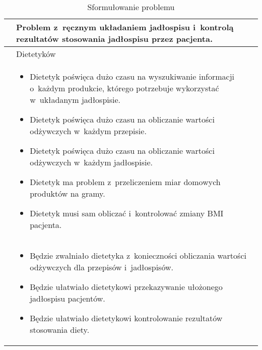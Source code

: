 \begin{minipage}{\textwidth}
    \begin{table}[H]
        \centering\caption{Sformułowanie problemu \source{\ownwork}\label{tabela:sformulowanie-problemu}}
        \begin{tabular}{|P{.2\textwidth}|p{.7\textwidth}|}

            \hline
             &
            Problem z~ręcznym układaniem jadłospisu i~kontrolą rezultatów stosowania jadłospisu przez pacjenta. \\
            \hline

             &
            Dietetyków \\
            \hline

             &
            \begin{itemize}
                \item Dietetyk poświęca dużo czasu na wyszukiwanie informacji o~każdym produkcie, którego potrzebuje wykorzystać w~układanym jadłospisie.
                \item Dietetyk poświęca dużo czasu na obliczanie wartości odżywczych w~każdym przepisie.
                \item Dietetyk poświęca dużo czasu na obliczanie wartości odżywczych w~każdym jadłospisie.
                \item Dietetyk ma problem z~przeliczeniem miar domowych produktów na gramy.
                \item Dietetyk musi sam obliczać i~kontrolować zmiany BMI pacjenta.
            \end{itemize} \\
            \hline

             &
            \begin{itemize}
                \item Będzie zwalniało dietetyka z~konieczności obliczania wartości odżywczych dla przepisów i~jadłospisów.
                \item Będzie ułatwiało dietetykowi przekazywanie ułożonego jadłospisu pacjentów.
                \item Będzie ułatwiało dietetykowi kontrolowanie rezultatów stosowania diety.
            \end{itemize} \\
            \hline
        \end{tabular}
    \end{table}
\end{minipage}

